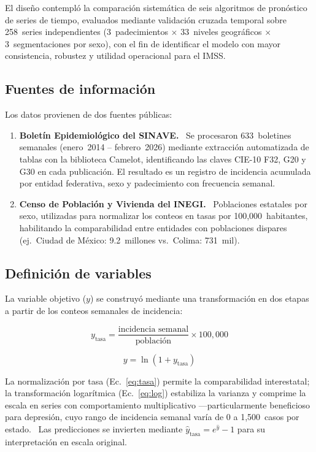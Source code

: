 \documentclass[12pt,a4paper]{article}
\begin{document}
El diseño contempló la comparación sistemática de seis algoritmos de pronóstico de series de tiempo, evaluados mediante validación cruzada temporal sobre 258~series independientes (3~padecimientos $\times$ 33~niveles geográficos $\times$ 3~segmentaciones por sexo), con el fin de identificar el modelo con mayor consistencia, robustez y utilidad operacional para el IMSS.

\subsection*{Fuentes de información}

Los datos provienen de dos fuentes públicas:

\begin{enumerate}[nosep]
    \item \textbf{Boletín Epidemiológico del SINAVE.}~\cite{sinave} Se procesaron 633~boletines semanales (enero~2014 -- febrero~2026) mediante extracción automatizada de tablas con la biblioteca Camelot, identificando las claves CIE-10 F32, G20 y G30 en cada publicación. El resultado es un registro de incidencia acumulada por entidad federativa, sexo y padecimiento con frecuencia semanal.

    \item \textbf{Censo de Población y Vivienda del INEGI.}~\cite{inegi2020} Poblaciones estatales por sexo, utilizadas para normalizar los conteos en tasas por 100,000~habitantes, habilitando la comparabilidad entre entidades con poblaciones dispares (ej.\ Ciudad de México: 9.2~millones vs.\ Colima: 731~mil).
\end{enumerate}

\subsection*{Definición de variables}

La variable objetivo ($y$) se construyó mediante una transformación en dos etapas a partir de los conteos semanales de incidencia:

\begin{equation}
y_{\text{tasa}} = \frac{\text{incidencia semanal}}{\text{población}} \times 100{,}000
\label{eq:tasa}
\end{equation}

\begin{equation}
y = \ln(1 + y_{\text{tasa}})
\label{eq:log}
\end{equation}

La normalización por tasa (Ec.~\ref{eq:tasa}) permite la comparabilidad interestatal; la transformación logarítmica (Ec.~\ref{eq:log}) estabiliza la varianza y comprime la escala en series con comportamiento multiplicativo ---particularmente beneficioso para depresión, cuyo rango de incidencia semanal varía de 0 a 1,500~casos por estado.~\cite{tokunaga2025} Las predicciones se invierten mediante $\hat{y}_{\text{tasa}} = e^{\hat{y}} - 1$ para su interpretación en escala original.
\end{document}
